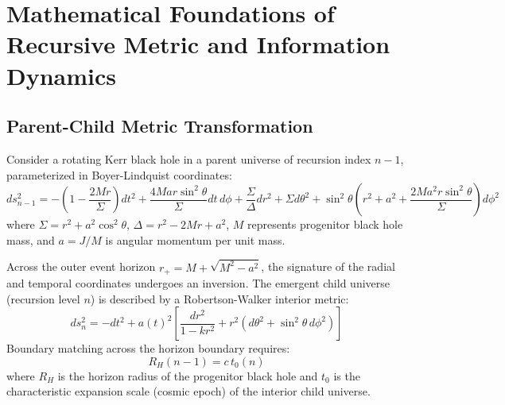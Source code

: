 \documentclass[11pt,a4paper]{article}
\begin{document}
\section{Mathematical Foundations of Recursive Metric and Information Dynamics}
\subsection{Parent-Child Metric Transformation}
Consider a rotating Kerr black hole in a parent universe of recursion index $n-1$, parameterized in Boyer-Lindquist coordinates:
\begin{equation}
ds^2_{n-1} = -\left(1 - \frac{2Mr}{\Sigma}\right)dt^2 + \frac{4Mar \sin^2\theta}{\Sigma} dt\,d\phi + \frac{\Sigma}{\Delta} dr^2 + \Sigma d\theta^2 + \sin^2\theta\left(r^2 + a^2 + \frac{2Ma^2r \sin^2\theta}{\Sigma}\right)d\phi^2
\end{equation}
where $\Sigma = r^2 + a^2 \cos^2\theta$, $\Delta = r^2 - 2Mr + a^2$, $M$ represents progenitor black hole mass, and $a = J/M$ is angular momentum per unit mass.

Across the outer event horizon $r_+ = M + \sqrt{M^2 - a^2}$, the signature of the radial and temporal coordinates undergoes an inversion. The emergent child universe (recursion level $n$) is described by a Robertson-Walker interior metric:
\begin{equation}
ds^2_n = -dt^2 + a(t)^2 \left[\frac{dr^2}{1 - kr^2} + r^2(d\theta^2 + \sin^2\theta\, d\phi^2)\right]
\end{equation}
Boundary matching across the horizon boundary requires:
\begin{equation}
R_H(n-1) = c\, t_0(n)
\end{equation}
where $R_H$ is the horizon radius of the progenitor black hole and $t_0$ is the characteristic expansion scale (cosmic epoch) of the interior child universe.
\end{document}
